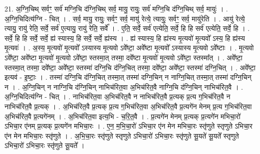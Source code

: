 \documentclass[17pt]{extarticle}
\begin{document}
21. अ॒ग्नि॒चिथ् सर्वꣳ॒॒ सर्व॑ मग्नि॒चि द॑ग्नि॒चिथ् सर्व॒ मायु॒ रायुः॒ सर्व॑ मग्नि॒चि द॑ग्नि॒चिथ् सर्व॒ मायुः॑ । . अ॒ग्नि॒चिदित्य॑ग्नि - चित् । . सर्व॒ मायु॒ रायुः॒ सर्वꣳ॒॒ सर्व॒ मायु॑ रेत्ये॒ त्यायुः॒ सर्वꣳ॒॒ सर्व॒ मायु॑रेति । . आयु॑ रेत्ये॒ त्यायु॒ रायु॑ रेति॒ सर्वे॒ सर्व॑ ए॒त्यायु॒ रायु॑ रेति॒ सर्वे᳚ । . ए॒ति॒ सर्वे॒ सर्व॑ एत्येति॒ सर्वे॒ हि हि सर्व॑ एत्येति॒ सर्वे॒ हि । . सर्वे॒ हि हि सर्वे॒ सर्वे॒ ह्य॑ स्यास्य॒ हि सर्वे॒ सर्वे॒ ह्य॑स्य । . ह्य॑ स्यास्य॒ हि ह्य॑स्य मृ॒त्यवो॑ मृ॒त्यवो᳚ ऽस्य॒ हि ह्य॑स्य मृ॒त्यवः॑ । . अ॒स्य॒ मृ॒त्यवो॑ मृ॒त्यवो᳚ ऽस्यास्य मृ॒त्यवो ऽवे᳚ष्टा॒ अवे᳚ष्टा मृ॒त्यवो᳚ ऽस्यास्य मृ॒त्यवो ऽवे᳚ष्टाः । . मृ॒त्यवो ऽवे᳚ष्टा॒ अवे᳚ष्टा मृ॒त्यवो॑ मृ॒त्यवो ऽवे᳚ष्टा॒ स्तस्मा॒त् तस्मा॒ दवे᳚ष्टा मृ॒त्यवो॑ मृ॒त्यवो ऽवे᳚ष्टा॒ स्तस्मा᳚त् । . अवे᳚ष्टा॒ स्तस्मा॒त् तस्मा॒ दवे᳚ष्टा॒ अवे᳚ष्टा॒ स्तस्मा॑ दग्नि॒चि द॑ग्नि॒चित् तस्मा॒ दवे᳚ष्टा॒ अवे᳚ष्टा॒ स्तस्मा॑ दग्नि॒चित् । . अवे᳚ष्टा॒ इत्यव॑ - इ॒ष्टाः॒ । . तस्मा॑ दग्नि॒चि द॑ग्नि॒चित् तस्मा॒त् तस्मा॑ दग्नि॒चिन् न नाग्नि॒चित् तस्मा॒त् तस्मा॑ दग्नि॒चिन् न । . अ॒ग्नि॒चिन् न नाग्नि॒चि द॑ग्नि॒चिन् नाभिच॑रित॒वा अ॒भिच॑रित॒वै नाग्नि॒चि द॑ग्नि॒चिन् नाभिच॑रित॒वै । . अ॒ग्नि॒चिदित्य॑ग्नि - चित् । . नाभिच॑रित॒वा अ॒भिच॑रित॒वै न नाभिच॑रित॒वै प्र॒त्यक् प्र॒त्य ग॒भिच॑रित॒वै न नाभिच॑रित॒वै प्र॒त्यक् । . अ॒भिच॑रित॒वै प्र॒त्यक् प्र॒त्य ग॒भिच॑रित॒वा अ॒भिच॑रित॒वै प्र॒त्यगे॑न मेनम् प्र॒त्य ग॒भिच॑रित॒वा अ॒भिच॑रित॒वै प्र॒त्यगे॑नम् । . अ॒भिच॑रित॒वा इत्य॒भि - च॒रि॒त॒वै । . प्र॒त्यगे॑न मेनम् प्र॒त्यक् प्र॒त्यगे॑न मभिचा॒रो॑ ऽभिचा॒र ए॑नम् प्र॒त्यक् प्र॒त्यगे॑न मभिचा॒रः । . ए॒न॒ म॒भि॒चा॒रो॑ ऽभिचा॒र ए॑न मेन मभिचा॒रः स्तृ॑णुते स्तृणुते ऽभिचा॒र ए॑न मेन मभिचा॒रः स्तृ॑णुते । . अ॒भि॒चा॒रः स्तृ॑णुते स्तृणुते ऽभिचा॒रो॑ ऽभिचा॒रः स्तृ॑णुते सू॒यते॑ सू॒यते᳚ स्तृणुते ऽभिचा॒रो॑ ऽभिचा॒रः स्तृ॑णुते सू॒यते᳚ । \newline
\end{document}
